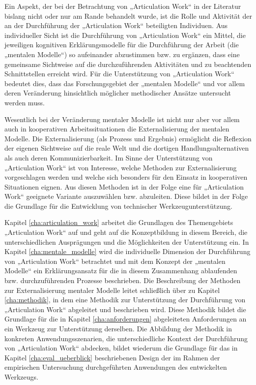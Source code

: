 Ein Aspekt, der bei der Betrachtung von „Articulation Work“ in der Literatur bislang nicht oder nur am Rande behandelt wurde, ist die Rolle und Aktivität der an der Durchführung der „Articulation Work“ beteiligten Individuen. Aus individueller Sicht ist die Durchführung von „Articulation Work“ ein Mittel, die jeweiligen kognitiven Erklärungsmodelle für die Durchführung der Arbeit (die „mentalen Modelle“) so aufeinander abzustimmen bzw. zu ergänzen, dass eine gemeinsame Sichtweise auf die durchzuführenden Aktivitäten und zu beachtenden Schnittstellen erreicht wird. Für die Unterstützung von „Articulation Work“ bedeutet dies, dass das Forschungsgebiet der „mentalen Modelle“ und vor allem deren Veränderung hinsichtlich möglicher methodischer Ansätze untersucht werden muss.

Wesentlich bei der Veränderung mentaler Modelle ist nicht nur aber vor allem auch in kooperativen Arbeitssituationen die Externalisierung der mentalen Modelle. Die Externalisierung (als Prozess und Ergebnis) ermöglicht die Reflexion der eigenen Sichtweise auf die reale Welt und die dortigen Handlungsalternativen als auch deren Kommunizierbarkeit. Im Sinne der Unterstützung von „Articulation Work“ ist von Interesse, welche Methoden zur Externalisierung vorgeschlagen werden und welche sich besonders für den Einsatz in kooperativen Situationen eignen. Aus diesen Methoden ist in der Folge eine für „Articulation Work“ geeignete Variante auszuwählen bzw. abzuleiten. Diese bildet in der Folge die Grundlage für die Entwicklung von technischer Werkzeugunterstützung. 

Kapitel \ref{cha:articulation_work} arbeitet die Grundlagen des Themengebiets „Articulation Work“ auf und geht auf die Konzeptbildung in diesem Bereich, die unterschiedlichen Ausprägungen und die Möglichkeiten der Unterstützung ein. In Kapitel \ref{cha:mentale_modelle} wird die individuelle Dimension der Durchführung von „Articulation Work“ betrachtet und mit dem Konzept der „mentalen Modelle“ ein Erklärungsansatz für die in diesem Zusammenhang ablaufenden bzw. durchzuführenden Prozesse beschrieben. Die Beschreibung der Methoden zur Externalisierung mentaler Modelle leitet schließlich über zu Kapitel \ref{cha:methodik}, in dem eine Methodik zur Unterstützung der Durchführung von „Articulation Work“ abgeleitet und beschrieben wird. Diese Methodik bildet die Grundlage für die in Kapitel \ref{cha:anforderungen} abgeleiteten Anforderungen an ein Werkzeug zur Unterstützung derselben. Die Abbildung der Methodik in konkreten Anwendungsszenarien, die unterschiedliche Kontext der Durchführung von „Articulation Work“ abdecken, bildet wiederum die Grundlage für das in Kapitel \ref{cha:eval_ueberblick} beschriebenen Design der im Rahmen der empirischen Untersuchung durchgeführten Anwendungen des entwickelten Werkzeugs.






